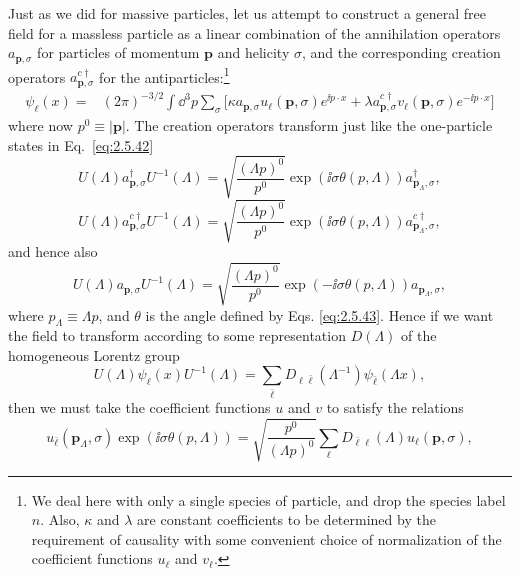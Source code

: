 Just as we did for massive particles, let us attempt to construct a general
free field for a massless particle as a linear combination of the annihilation
operators $a_{\mathbf p,\sigma}$ for particles of momentum $\mathbf p$ and
helicity $\sigma$, and the corresponding creation operators
$a^{c\dagger}_{\mathbf p,\sigma}$ for the antiparticles:\footnote{We deal here
with only a single species of particle, and drop the species label $n$. Also,
$\kappa$ and $\lambda$ are constant coefficients to be determined by the
requirement of causality with some convenient choice of normalization of the
coefficient functions $u_\ell$ and $v_\ell$.}
\begin{align}
\psi_\ell(x)={}&(2\pi)^{-3/2}\int \dd^3p\sum_\sigma
\bigl[\kappa a_{\mathbf p,\sigma}u_\ell(\mathbf p,\sigma)e^{\ii p\cdot x}
+\lambda a^{c\dagger}_{\mathbf p,\sigma}
v_\ell(\mathbf p,\sigma)e^{-\ii p\cdot x}\bigr]
\tag{5.9.1}\label{eq:5.9.1}
\end{align}
where now $p^0\equiv|\mathbf p|$. The creation operators transform just like
the one-particle states in Eq.~\eqref{eq:2.5.42}
\begin{equation}
U(\Lambda)a^\dagger_{\mathbf p,\sigma}U^{-1}(\Lambda)=
\sqrt{\frac{(\Lambda p)^0}{p^0}}\exp(\ii\sigma\theta(p,\Lambda))
a^\dagger_{\mathbf p_\Lambda,\sigma},
\tag{5.9.2}\label{eq:5.9.2}
\end{equation}
\begin{equation}
U(\Lambda)a^{c\dagger}_{\mathbf p,\sigma}U^{-1}(\Lambda)=
\sqrt{\frac{(\Lambda p)^0}{p^0}}\exp(\ii\sigma\theta(p,\Lambda))
a^{c\dagger}_{\mathbf p_\Lambda,\sigma},
\tag{5.9.3}\label{eq:5.9.3}
\end{equation}
and hence also
\begin{equation}
U(\Lambda)a_{\mathbf p,\sigma}U^{-1}(\Lambda)=
\sqrt{\frac{(\Lambda p)^0}{p^0}}\exp(-\ii\sigma\theta(p,\Lambda))
a_{\mathbf p_\Lambda,\sigma},
\tag{5.9.4}\label{eq:5.9.4}
\end{equation}
where $p_\Lambda\equiv\Lambda p$, and $\theta$ is the angle defined by Eqs.
\eqref{eq:2.5.43}. Hence if we want the field to transform according to some
representation $D(\Lambda)$ of the homogeneous Lorentz group
\begin{equation}
U(\Lambda)\psi_\ell(x)U^{-1}(\Lambda)=
\sum_{\bar\ell}D_{\ell\bar\ell}(\Lambda^{-1})
\psi_{\bar\ell}(\Lambda x),
\tag{5.9.5}\label{eq:5.9.5}
\end{equation}
then we must take the coefficient functions $u$ and $v$ to satisfy the
relations
\begin{equation}
u_{\bar\ell}(\mathbf p_\Lambda,\sigma)
\exp(\ii\sigma\theta(p,\Lambda))=
\sqrt{\frac{p^0}{(\Lambda p)^0}}
\sum_\ell D_{\bar\ell\ell}(\Lambda)u_\ell(\mathbf p,\sigma),
\tag{5.9.6}\label{eq:5.9.6}
\end{equation}
